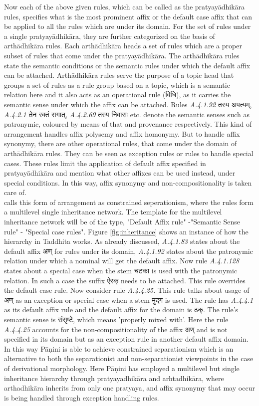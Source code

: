 \documentclass[a4paper,11pt,twoside,openright]{report}
\begin{document}
Now each of the above given rules, which can be called as the pratyayādhikāra rules, specifies what is the most prominent affix or the default case affix that can be applied to all the rules which are under its domain. For the set of rules under a single pratyayādhikāra, they are further categorized on the basis of arthādhikāra rules. Each arthādhikāra heads a set of rules which are a proper subset of rules that come under the pratyayādhikāra. The arthādhikāra rules state the semantic conditions or the semantic rules under which the default affix can be attached. Arthādhikāra rules serve the purpose of a topic head that groups a set of rules as a rule group based on a topic, which is a semantic relation here and it also acts as an operational rule ({\skt विधि}), as it carries the semantic sense under which the affix can be attached. Rules \textsl{ A.4.1.92} {\skt तस्य अपत्यम्}, \textsl{ A.4.2.1} {\skt तेन रक्तं रागात्}, \textsl{ A.4.2.69} {\skt तस्य निवासः} etc. denote the semantic senses such as patronymic, coloured by means of that and provenance respectively. This kind of arrangement handles affix polysemy and affix homonymy. But to handle affix synonymy, there are other operational rules, that come under the domain of arthādhikāra rules. They can be seen as exception rules or rules to handle special cases. These rules limit the application of default affix specified in pratyayādhikāra and mention what other affixes can be used instead, under special conditions. In this way, affix synonymy and non-compositionality is taken care of.\\ 
 calls this form of arrangement as constrained seperationism, where the rules form a multilevel single inheritance network. The template for the multilevel inheritance network will be of the type,  "Default Affix rule" -"Semantic Sense rule" - "Special case rules". Figure \ref{fig:inheritance} shows an instance of how the hierarchy in Taddhita works. As already discussed, \textsl{ A.4.1.83} states about the default affix {\skt अण्} for rules under its domain, \textsl{ A.4.1.92 }states about the patronymic relation under which a nominal will get the default affix. Now rule \textsl{ A.4.1.128} states about a special case when the stem {\skt चटका} is used with the patronymic relation. In such a case the suffix {\skt ऐरक्} needs to be attached. This rule overrides the default case rule. Now consider rule \textsl{ A.4.4.25.} This rule talks about usage of {\skt अण्} as an exception or special case when a stem {\skt मुद्ग} is used. The rule has \textsl{ A.4.4.1} as its default affix rule and the default affix for the domain is {\skt ठक्}. The rule's semantic sense is {\skt संसृष्टे}, which means 'properly mixed with'. Here the rule \textsl{ A.4.4.25} accounts for the non-compositionality of the affix {\skt अण्} and is not specified in its domain but as an exception rule in another default affix domain. In this way Pāṇini is able to achieve constrained separationism \cite{deo07} which is an alternative to both the separationist and non-separationist viewpoints in the case of derivational morphology. Here Pāṇini has employed a multilevel but single inheritance hierarchy through pratyayadhikāra and arhtadhikāra, where arthadhikāra inherits from only one pratyaya, and affix synonymy that may occur is being handled through exception handling rules.
\end{document}
